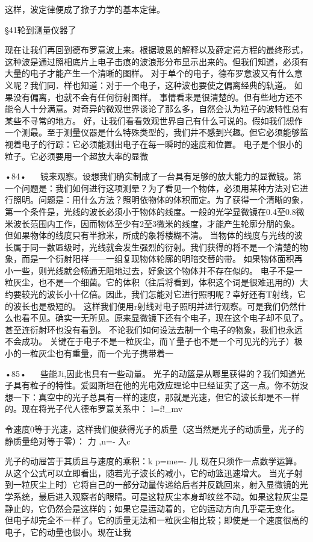这样，波定律便成了掀子力学的基本定律。

§41轮到测量仪器了

现在让我们再回到德布罗意波上来。根据玻恩的解释以及薛定谔方程的最终形式，这种波是通过照相底片上电子击痕的波浪形分布显示出来的。但我们知道，必须有大量的电子才能产生一个清晰的图样。
对于单个的电子，德布罗意波又有什么意义呢？我们同．样也知道：对于一个电子，这种波也要使之偏离经典的轨道。
如果没有偏离，也就不会有任何衍射图样。
事情看来是很清楚的。但有些地方还不能令人十分满意。对奇异的微观世界谈论了那么多，自然会认为粒子的波特性总有某些不寻常的地方。
好，让我们看看效观世界自己有什么可说的。假如我们想作一个测最。至于测量仪器是什么特殊类型的，我们井不感到兴趣。但它必须能够监视着电子的行踪：它必须能测出电子在每一瞬时的速度和位置。
电子是个很小的粒子。它必须要用一个超放大率的显微

•84•
  
镜来观察。设想我们确实制成了一台具有足够的放大能力的显微镜。第一个问题是：我们如何进行这项测晕？为了看见一个物体，必须用某种方法对它进行照明。问题是：用什么方法？照明依物体的体积而定。为了获得一个清晰的象，第一个条件是，光线的波长必须小于物体的线度。一般的光学显微镜在0.4至0.8微米波长范围内工作，因而物体至少有2至3微米的线度，才能产生轮廓分朋的象。
但如果物体的线度只有半掀米，所成的象将楼糊不清。
当物体的线度与光线的波长属于同一数匾级时，光线就会发生强烈的衍射。我们获得的将不是一个清楚的物象，而是一个衍射阳样——一组复现物体轮廓的明暗交替的带。
如果物体面积再小一些，则光线就会畅通无阻地过去，好象这个物体并不存在似的。
电子不是一粒灰尘，也不是一个细菌。它的体积（往后将看到，体积这个词是很难迅用的）大约要较光的波长小十亿倍。因此，我们怎能对它进行照明呢？幸好还有T射线，它的波长也是极短的。
这样我们便用r射线对电子照明并进行观察。可是我们仍然什么也看不见。确实一无所见。原来显微镜下还有个电子，现在这个电子却不见了。甚至连衍射环也没有看到。
不论我们如何设法去制一个电子的物象，我们也永远不会成功。
关键在于电子不是一粒灰尘，而丫量子也不是一个可见光的光子）极小的一粒灰尘也有重量，而一个光子携带着一

•85•
  
些能Ji,因此也具有一些动量。
光子的动篮是从哪里获得的？我们知道光子具有粒子的特性。爱囡斯坦在他的光电效应理论中巳经证实了这一点。你不妨没想一下：真空中的光子总具有一样的速度，那就是光速，但它的波长却是不一样的。现在将光子代人德布罗意关系中：
l=f!_mv

令速度0等于光速，这样我们便获得光子的质量（这当然是光子的动质量，光子的静质量绝对等于零）：
力
,n=-
入c

光子的动屉笘于其质且与速度的乘积：k
p=me=-
儿
现在只须作一点数学运算。从这个公式可以立即看出，随若光子波长的减小，它的动篮迅速增大。
当光子射到一粒灰尘上时）它将自己的一部分动量传递给后者并反跳回来，射入显微镜的光学系统，最后进入观察者的眼睛。可是这粒灰尘本身却纹丝不动。如果这粒灰尘是静止的，它仍然会是这样的；如果它是运动着的，它的运动方向几乎亳无变化。
但电子却完全不一样了。它的质量无法和一粒灰尘相比较；即使是一个速度很高的电子，它的动量也很小。现在让我



